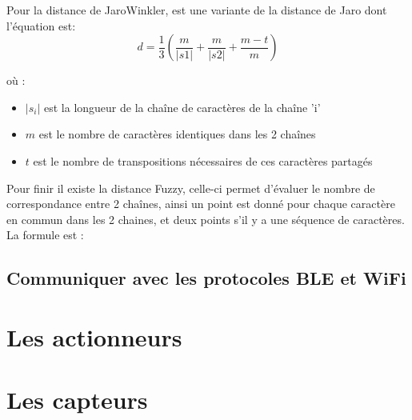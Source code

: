 Pour la distance de JaroWinkler, est une variante de la distance de Jaro dont l'équation est:
\begin{equation}
 d = \frac{1}{3}(\frac{m}{|s1|}+\frac{m}{|s2|}+\frac{m-t}{m})
\end{equation}

où :
\begin{itemize}
 \item $|s_i|$ est la longueur de la chaîne de caractères de la chaîne 'i'
 \item $m$ est le nombre de caractères identiques dans les 2 chaînes
 \item $t$ est le nombre de transpositions nécessaires de ces caractères partagés
\end{itemize}

Pour finir il existe la distance Fuzzy, celle-ci permet d'évaluer le nombre de correspondance entre 2 chaînes, ainsi un point est donné pour chaque caractère en commun dans les 2 chaines, et deux points s'il y a une séquence de caractères. La formule est : 


	\subsection{Communiquer avec les protocoles BLE et WiFi}
\section{Les actionneurs}
\section{Les capteurs}



